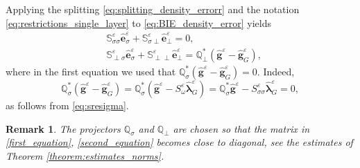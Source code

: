 \documentclass[]{article}
\newtheorem{remark}{Remark}
\numberwithin{equation}{section}
\numberwithin{theorem}{section}
\numberwithin{lemma}{section}
\numberwithin{corollary}{section}
\numberwithin{proposition}{section}
\numberwithin{definition}{section}
\newcommand{\re}{\varepsilon}
\renewcommand{\vec}{\boldsymbol}
\begin{document}
	Applying the splitting \eqref{eq:splitting_density_errorr} and the notation \eqref{eq:restrictions_single_layer} to \eqref{eq:BIE_density_error} yields
	\begin{align}
		&\mathbb{S}^{\re}_{\sigma\sigma} \hat{\vec{e}}^{\re}_{\sigma} + \mathbb{S}^{\re}_{\sigma \perp} \hat{\vec{e}}^{\re}_{\perp} =0, \label{first_equation} \\
		&\mathbb{S}^{\re}_{\perp \sigma} \hat{\vec{e}}^{\re}_{\sigma} + \mathbb{S}^{\re}_{\perp \perp} \hat{\vec{e}}^{\re}_{\perp} = \mathbb{Q}^{*}_{\perp} (\hat{\vec{g}}^{\re} - \hat{\vec{g}}^{\re}_{G}), \label{second_equation}
	\end{align}
	where in the first equation we used that  $\mathbb{Q}^*_{\sigma}(\hat{\vec{g}}^{\re} - \hat{\vec{g}}^{\re}_G) = 0$. Indeed, $$\mathbb{Q}^*_{\sigma}(\hat{\vec{g}}^{\re} - \hat{\vec{g}}^{\re}_G)=\mathbb{Q}^*_{\sigma}(\hat{\vec{g}}^{\re} - S^{\re}_{\omega}\hat{\vec{\lambda}}_{G}^{\re})=\mathbb{Q}^*_{\sigma}\hat{\vec{g}}^{\re} - S^{\re}_{\sigma\sigma}\hat{\vec{\lambda}}_{G}^{\re}=0,$$
	as follows from \eqref{eq:sresigma}. 
	\begin{remark}
		The projectors $\mathbb{Q}_{\sigma}$ and $\mathbb{Q}_{\perp}$ are chosen so that the matrix in \eqref{first_equation}, \eqref{second_equation} becomes close to diagonal, see the estimates of Theorem \ref{theorem:estimates_norms}.	
	\end{remark}
	
	
	
\end{document}

